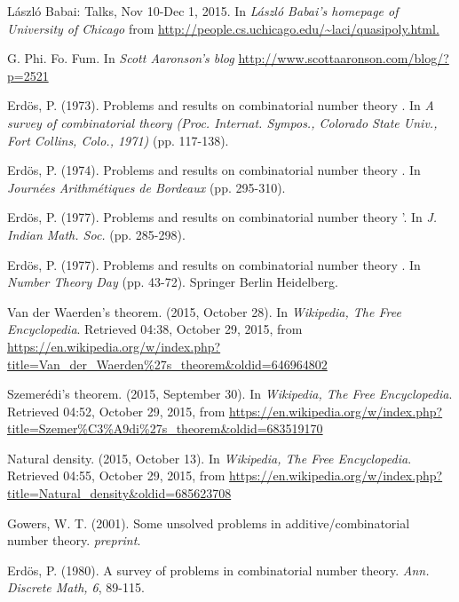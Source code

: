 \documentclass[12pt]{article}
\begin{document}
\bigskip

\begin{thebibliography}{99}
 L\'{a}szl\'{o} Babai: Talks, Nov 10-Dec 1, 2015. In \textit{L\'{a}szl\'{o} Babai's homepage of University of Chicago} from \url{http://people.cs.uchicago.edu/~laci/quasipoly.html.}

 G. Phi. Fo. Fum. In \textit{Scott Aaronson's blog} \url{http://www.scottaaronson.com/blog/?p=2521}

 Erd\"{o}s, P. (1973). Problems and results on combinatorial number theory \uppercase\expandafter{}. In \textit{A survey of combinatorial theory (Proc. Internat. Sympos., Colorado State Univ., Fort Collins, Colo., 1971)} (pp. 117-138).

 Erd\"{o}s, P. (1974). Problems and results on combinatorial number theory \uppercase\expandafter{}. In \textit{Journ\'{e}es Arithm\'{e}tiques de Bordeaux} (pp. 295-310).

 Erd\"{o}s, P. (1977). Problems and results on combinatorial number theory \uppercase\expandafter{}'. In \textit{J. Indian Math. Soc.} (pp. 285-298).

 Erd\"{o}s, P. (1977). Problems and results on combinatorial number theory \uppercase\expandafter{}. In \textit{Number Theory Day} (pp. 43-72). Springer Berlin Heidelberg.

 Van der Waerden's theorem. (2015, October 28). In \textit{Wikipedia, The Free Encyclopedia}. Retrieved 04:38, October 29, 2015, from \url{https://en.wikipedia.org/w/index.php?title=Van_der_Waerden%27s_theorem&oldid=646964802}

 Szemer\'{e}di's theorem. (2015, September 30). In \textit{Wikipedia, The Free Encyclopedia}. Retrieved 04:52, October 29, 2015, from \url{https://en.wikipedia.org/w/index.php?title=Szemer%C3%A9di%27s_theorem&oldid=683519170}

 Natural density. (2015, October 13). In \textit{Wikipedia, The Free Encyclopedia}. Retrieved 04:55, October 29, 2015, from \url{https://en.wikipedia.org/w/index.php?title=Natural_density&oldid=685623708}

 Gowers, W. T. (2001). Some unsolved problems in additive/combinatorial number theory. \textit{preprint}.

 Erd\"{o}s, P. (1980). A survey of problems in combinatorial number theory. \textit{Ann. Discrete Math, 6}, 89-115.


\end{thebibliography}
\end{document}

